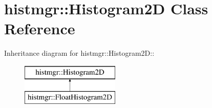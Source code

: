 \section{histmgr::Histogram2D Class Reference}
\label{classhistmgr_1_1Histogram2D}
Inheritance diagram for histmgr::Histogram2D::\begin{figure}[H]
\begin{center}
\leavevmode
\includegraphics[height=2cm]{classhistmgr_1_1Histogram2D}
\end{center}
\end{figure}
